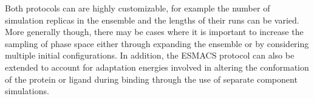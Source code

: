 Both protocols can are highly customizable, for example the number of simulation replicas in the 
ensemble and the lengths of their runs can be varied.
More generally though, there may be cases where it is important to increase the sampling of phase 
space either through expanding the ensemble or by considering multiple initial configurations.
In addition, the ESMACS protocol can also be extended to account for adaptation energies involved 
in altering the conformation of the protein or ligand during binding through the use of separate 
component simulations.


